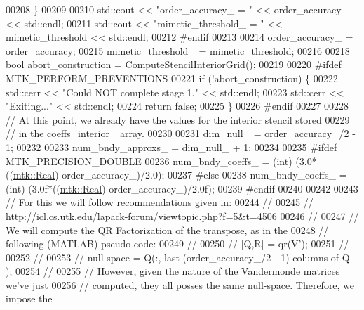 \begin{DoxyCode}
00208   \}
00209 
00210   std::cout << \textcolor{stringliteral}{"order\_accuracy\_ = "} << order\_accuracy << std::endl;
00211   std::cout << \textcolor{stringliteral}{"mimetic\_threshold\_ = "} << mimetic\_threshold << std::endl;
00212 \textcolor{preprocessor}{  #endif}
00213 
00214   order\_accuracy\_ = order\_accuracy;
00215   mimetic\_threshold\_ = mimetic\_threshold;
00216 
00218   \textcolor{keywordtype}{bool} abort\_construction = ComputeStencilInteriorGrid();
00219 
00220 \textcolor{preprocessor}{  #ifdef MTK\_PERFORM\_PREVENTIONS}
00221   \textcolor{keywordflow}{if} (!abort\_construction) \{
00222     std::cerr << \textcolor{stringliteral}{"Could NOT complete stage 1."} << std::endl;
00223     std::cerr << \textcolor{stringliteral}{"Exiting..."} << std::endl;
00224     \textcolor{keywordflow}{return} \textcolor{keyword}{false};
00225   \}
00226 \textcolor{preprocessor}{  #endif}
00227 
00228   \textcolor{comment}{// At this point, we already have the values for the interior stencil stored}
00229   \textcolor{comment}{// in the coeffs\_interior\_ array.}
00230 
00231   dim\_null\_ = order\_accuracy\_/2 - 1;
00232 
00233   num\_bndy\_approxs\_ = dim\_null\_ + 1;
00234 
00235 \textcolor{preprocessor}{  #ifdef MTK\_PRECISION\_DOUBLE}
00236   num\_bndy\_coeffs\_ = (int) (3.0*((\hyperlink{group__c01-roots_gac080bbbf5cbb5502c9f00405f894857d}{mtk::Real}) order\_accuracy\_)/2.0);
00237 \textcolor{preprocessor}{  #else}
00238   num\_bndy\_coeffs\_ = (int) (3.0f*((\hyperlink{group__c01-roots_gac080bbbf5cbb5502c9f00405f894857d}{mtk::Real}) order\_accuracy\_)/2.0f);
00239 \textcolor{preprocessor}{  #endif}
00240 
00242 
00243   \textcolor{comment}{// For this we will follow recommendations given in:}
00244   \textcolor{comment}{//}
00245   \textcolor{comment}{// http://icl.cs.utk.edu/lapack-forum/viewtopic.php?f=5&t=4506}
00246   \textcolor{comment}{//}
00247   \textcolor{comment}{// We will compute the QR Factorization of the transpose, as in the}
00248   \textcolor{comment}{// following (MATLAB) pseudo-code:}
00249   \textcolor{comment}{//}
00250   \textcolor{comment}{// [Q,R] = qr(V'); %
00251   \textcolor{comment}{// %
00252   \textcolor{comment}{//}
00253   \textcolor{comment}{// null-space = Q(:, last (order\_accuracy\_/2 - 1) columns of Q );}
00254   \textcolor{comment}{//}
00255   \textcolor{comment}{// However, given the nature of the Vandermonde matrices we've just}
00256   \textcolor{comment}{// computed, they all posses the same null-space. Therefore, we impose the}
}}
\end{DoxyCode}
